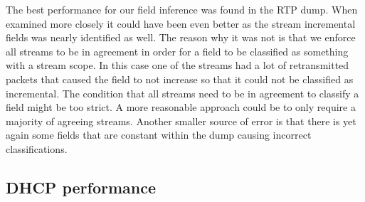 \documentclass[a4paper]{report}
\begin{document}
The best performance for our field inference was found in the RTP dump. When
examined more closely it could have been even better as the stream incremental
fields was nearly identified as well. The reason why it was not is that we
enforce all streams to be in agreement in order for a field to be classified as
something with a stream scope. In this case one of the streams had a lot of
retransmitted packets that caused the field to not increase so that it could
not be classified as incremental. The condition that all streams need to be in
agreement to classify a field might be too strict. A more reasonable approach
could be to only require a majority of agreeing streams. Another smaller source
of error is that there is yet again some fields that are constant within the
dump causing incorrect classifications.

\subsection{DHCP performance}
\end{document}
